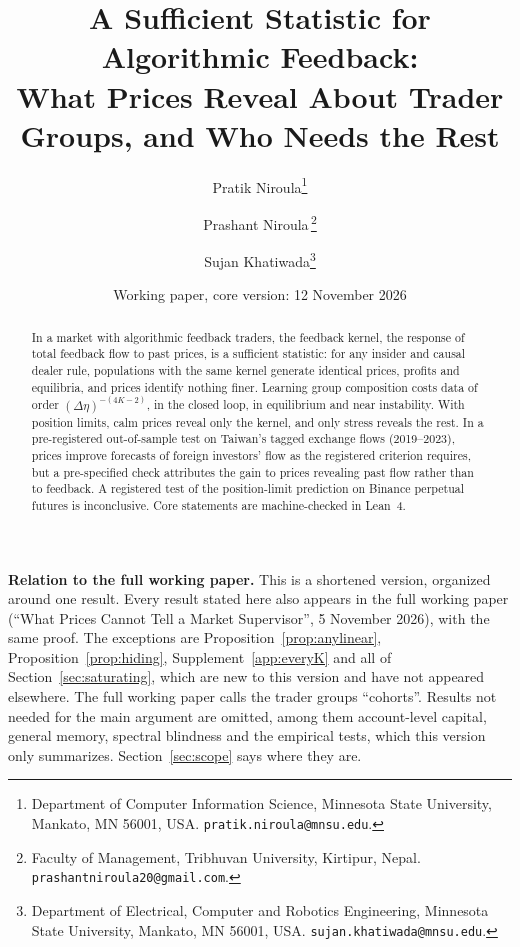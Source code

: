 \title{A Sufficient Statistic for Algorithmic Feedback:\\ What Prices Reveal About Trader Groups, and Who Needs the Rest}
\author{Pratik Niroula\thanks{Department of Computer Information Science, Minnesota State University, Mankato, MN 56001, USA. \texttt{pratik.niroula@mnsu.edu}.}
\and Prashant Niroula\,\thanks{Faculty of Management, Tribhuvan University, Kirtipur, Nepal. \texttt{prashantniroula20@gmail.com}.}
\and Sujan Khatiwada\thanks{Department of Electrical, Computer and Robotics Engineering, Minnesota State University, Mankato, MN 56001, USA. \texttt{sujan.khatiwada@mnsu.edu}.}}
\date{Working paper, core version: 12 November 2026}

\usepackage{array}
\makeatletter\g@addto@macro\UrlBreaks{\do\_}\makeatother

\maketitle
\thispagestyle{empty}\pagestyle{empty}
\begingroup\onehalfspacing

\begin{abstract}
\noindent In a market with algorithmic feedback traders, the feedback kernel, the response of total feedback flow to past prices, is a sufficient statistic: for any insider and causal dealer rule, populations with the same kernel generate identical prices, profits and equilibria, and prices identify nothing finer. Learning group composition costs data of order $(\Delta\eta)^{-(4K-2)}$, in the closed loop, in equilibrium and near instability. With position limits, calm prices reveal only the kernel, and only stress reveals the rest. In a pre-registered out-of-sample test on Taiwan's tagged exchange flows (2019--2023), prices improve forecasts of foreign investors' flow as the registered criterion requires, but a pre-specified check attributes the gain to prices revealing past flow rather than to feedback. A registered test of the position-limit prediction on Binance perpetual futures is inconclusive. Core statements are machine-checked in Lean~4.
\end{abstract}

\noindent\textbf{Relation to the full working paper.} This is a shortened version, organized around one result. Every result stated here also appears in the full working paper (``What Prices Cannot Tell a Market Supervisor'', 5 November 2026), with the same proof. The exceptions are Proposition~\ref{prop:anylinear}, Proposition~\ref{prop:hiding}, Supplement~\ref{app:everyK} and all of Section~\ref{sec:saturating}, which are new to this version and have not appeared elsewhere. The full working paper calls the trader groups ``co\-horts''. Results not needed for the main argument are omitted, among them account-level capital, general memory, spectral blindness and the empirical tests, which this version only summarizes. Section~\ref{sec:scope} says where they are.

